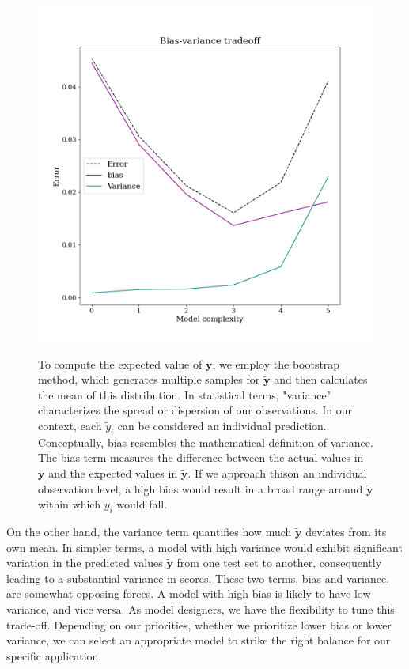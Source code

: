 \documentclass[twoside,11pt]{report}
\begin{document}
\begin{figure}[h]
\begin{minipage}[!t]{.48\linewidth}
    \begin{center}
        \includegraphics[width=1.0\textwidth]{../runsAndAdditions/bias-variance1.png}
        \caption{}\label{fig:bias-variance1}
    \end{center}
\end{minipage}
\hspace{2mm}
\begin{minipage}[!t]{.45\linewidth}
To compute the expected value of $\mathbf{\tilde{y}}$, we employ the bootstrap method, which generates multiple samples for $\mathbf{\tilde{y}}$ and then calculates the mean of this distribution.
In statistical terms, "variance" characterizes the spread or dispersion of our observations. In our context, 
each $\tilde{y}_i$ can be considered an individual prediction. Conceptually, bias resembles the mathematical 
definition of variance. The bias term measures the difference between the actual values in $\mathbf{y}$ and the
expected values in $\mathbf{\tilde{y}}$. If we approach thison an individual observation level, a high bias would result 
in a broad range around $\mathbf{\tilde{y}}$ within which $y_i$ would fall.
\end{minipage}
\end{figure}
On the other hand, the variance term quantifies how much $\mathbf{\tilde{y}}$ deviates from its own mean. 
In simpler terms, a model with high variance would exhibit significant variation in the predicted values 
$\mathbf{\tilde{y}}$ from one test set to another, consequently leading to a substantial variance in scores.
These two terms, bias and variance, are somewhat opposing forces. A model with high bias is likely to 
have low variance, and vice versa. As model designers, we have the flexibility to tune this trade-off. 
Depending on our priorities, whether we prioritize lower bias or lower variance, we can select an appropriate 
model to strike the right balance for our specific application.
\end{document}
